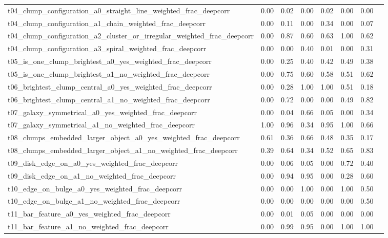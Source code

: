 \begin{table*}
{\begin{tabular}{@{}lccccccc}
t04\_clump\_configuration\_a0\_straight\_line\_weighted\_frac\_deepcorr & 0.00 & 0.02 & 0.00 & 0.02 & 0.00 & 0.00 & \\
t04\_clump\_configuration\_a1\_chain\_weighted\_frac\_deepcorr & 0.00 & 0.11 & 0.00 & 0.34 & 0.00 & 0.07 & \\
t04\_clump\_configuration\_a2\_cluster\_or\_irregular\_weighted\_frac\_deepcorr & 0.00 & 0.87 & 0.60 & 0.63 & 1.00 & 0.62 & \\
t04\_clump\_configuration\_a3\_spiral\_weighted\_frac\_deepcorr & 0.00 & 0.00 & 0.40 & 0.01 & 0.00 & 0.31 & \\
t05\_is\_one\_clump\_brightest\_a0\_yes\_weighted\_frac\_deepcorr & 0.00 & 0.25 & 0.40 & 0.42 & 0.49 & 0.38 & \\
t05\_is\_one\_clump\_brightest\_a1\_no\_weighted\_frac\_deepcorr & 0.00 & 0.75 & 0.60 & 0.58 & 0.51 & 0.62 & \\
t06\_brightest\_clump\_central\_a0\_yes\_weighted\_frac\_deepcorr & 0.00 & 0.28 & 1.00 & 1.00 & 0.51 & 0.18 & \\
t06\_brightest\_clump\_central\_a1\_no\_weighted\_frac\_deepcorr & 0.00 & 0.72 & 0.00 & 0.00 & 0.49 & 0.82 & \\
t07\_galaxy\_symmetrical\_a0\_yes\_weighted\_frac\_deepcorr & 0.00 & 0.04 & 0.66 & 0.05 & 0.00 & 0.34 & \\
t07\_galaxy\_symmetrical\_a1\_no\_weighted\_frac\_deepcorr & 1.00 & 0.96 & 0.34 & 0.95 & 1.00 & 0.66 & \\
t08\_clumps\_embedded\_larger\_object\_a0\_yes\_weighted\_frac\_deepcorr & 0.61 & 0.36 & 0.66 & 0.48 & 0.35 & 0.17 & \\
t08\_clumps\_embedded\_larger\_object\_a1\_no\_weighted\_frac\_deepcorr & 0.39 & 0.64 & 0.34 & 0.52 & 0.65 & 0.83 & \\
t09\_disk\_edge\_on\_a0\_yes\_weighted\_frac\_deepcorr & 0.00 & 0.06 & 0.05 & 0.00 & 0.72 & 0.40 & \\
t09\_disk\_edge\_on\_a1\_no\_weighted\_frac\_deepcorr & 0.00 & 0.94 & 0.95 & 0.00 & 0.28 & 0.60 & \\
t10\_edge\_on\_bulge\_a0\_yes\_weighted\_frac\_deepcorr & 0.00 & 0.00 & 1.00 & 0.00 & 1.00 & 0.50 & \\
t10\_edge\_on\_bulge\_a1\_no\_weighted\_frac\_deepcorr & 0.00 & 0.00 & 0.00 & 0.00 & 0.00 & 0.50 & \\
t11\_bar\_feature\_a0\_yes\_weighted\_frac\_deepcorr & 0.00 & 0.01 & 0.05 & 0.00 & 0.00 & 0.00 & \\
t11\_bar\_feature\_a1\_no\_weighted\_frac\_deepcorr & 0.00 & 0.99 & 0.95 & 0.00 & 1.00 & 1.00 & \\

\end{tabular}}
\end{table*}

